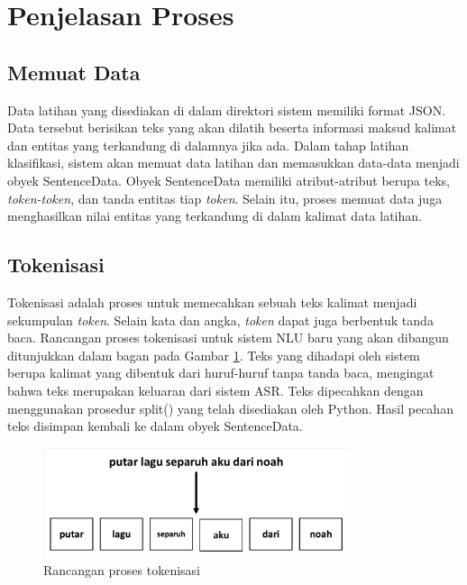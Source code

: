 \section{Penjelasan Proses}

\subsection{Memuat Data}

Data latihan yang disediakan di dalam direktori sistem memiliki format JSON. Data tersebut berisikan teks yang akan dilatih beserta informasi maksud kalimat dan entitas yang terkandung di dalamnya jika ada. Dalam tahap latihan klasifikasi, sistem akan memuat data latihan dan memasukkan data-data menjadi obyek SentenceData. Obyek SentenceData memiliki atribut-atribut berupa teks, \textit{token-token}, dan tanda entitas tiap \textit{token}. Selain itu, proses memuat data juga menghasilkan nilai entitas yang terkandung di dalam kalimat data latihan.

\subsection{Tokenisasi}

Tokenisasi adalah proses untuk memecahkan sebuah teks kalimat menjadi sekumpulan \textit{token}. Selain kata dan angka, \textit{token} dapat juga berbentuk tanda baca. Rancangan proses tokenisasi untuk sistem NLU baru yang akan dibangun ditunjukkan dalam bagan pada Gambar \ref{fig:design_token}. Teks yang dihadapi oleh sistem berupa kalimat yang dibentuk dari huruf-huruf tanpa tanda baca, mengingat bahwa teks merupakan keluaran dari sistem ASR. Teks dipecahkan dengan menggunakan prosedur split() yang telah disediakan oleh Python. Hasil pecahan teks disimpan kembali ke dalam obyek SentenceData.

\begin{figure}[H]
	\centering
	\includegraphics[width=0.8\textwidth, trim=2 2 2 2, clip]{resources/4-design_token.pdf}
	\caption{Rancangan proses tokenisasi}
	\label{fig:design_token}
\end{figure}

